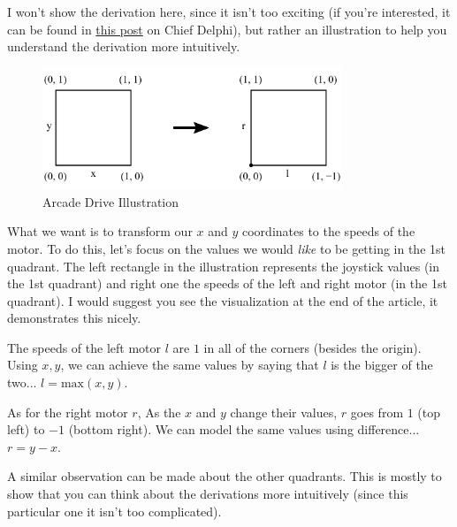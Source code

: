 \documentclass[12pt,twoside]{article}
\begin{document}
I won't show the derivation here, since it isn't too exciting (if you're interested, it can be found in \href{https://www.chiefdelphi.com/t/paper-arcade-drive/168720}{this post} on Chief Delphi), but rather an illustration to help you understand the derivation more intuitively.

\begin{figure}[H]
\centering
\includegraphics[width=0.8\textwidth]{../assets/images/drivetrain-control/arcade-drive-illustration.png}
\caption{Arcade Drive Illustration}
\end{figure}

What we want is to transform our $x$ and $y$ coordinates to the speeds of the motor. To do this, let's focus on the values we would \textit{like} to be getting in the 1st quadrant. The left rectangle in the illustration represents the joystick values (in the 1st quadrant) and right one the speeds of the left and right motor (in the 1st quadrant). I would suggest you see the visualization at the end of the article, it demonstrates this nicely.

The speeds of the left motor $l$ are $1$ in all of the corners (besides the origin). Using $x, y$, we can achieve the same values by saying that $l$ is the bigger of the two... $l = \text{max}(x, y)$.

As for the right motor $r$, As the $x$ and $y$ change their values, $r$ goes from $1$ (top left) to $-1$ (bottom right). We can model the same values using difference... $r = y - x$.

A similar observation can be made about the other quadrants. This is mostly to show that you can think about the derivations more intuitively (since this particular one it isn't too complicated).
\end{document}

